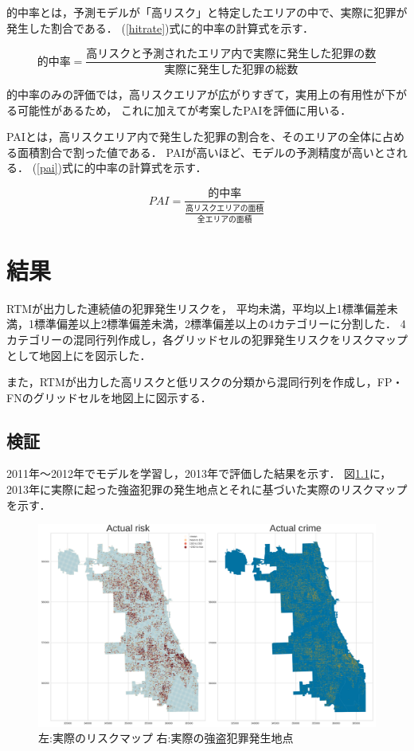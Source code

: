 \documentclass[12pt,a4paper,oneside]{jsbook}
\theoremstyle{plain}
\begin{document}
的中率とは，予測モデルが「高リスク」と特定したエリアの中で、実際に犯罪が発生した割合である．
(\ref{hitrate})式に的中率の計算式を示す．

\begin{equation}\label{hitrate}
  的中率=\frac{高リスクと予測されたエリア内で実際に発生した犯罪の数}{実際に発生した犯罪の総数}
\end{equation}

的中率のみの評価では，高リスクエリアが広がりすぎて，実用上の有用性が下がる可能性があるため，
これに加えて\citet{chainey2008utility}が考案したPAIを評価に用いる．

PAIとは，高リスクエリア内で発生した犯罪の割合を、そのエリアの全体に占める面積割合で割った値である．
PAIが高いほど、モデルの予測精度が高いとされる．
(\ref{pai})式に的中率の計算式を示す．

\begin{equation}\label{pai}
  PAI=\frac{的中率}
  {\frac{高リスクエリアの面積}{全エリアの面積}}
\end{equation}

\chapter{結果}
RTMが出力した連続値の犯罪発生リスクを，
平均未満，平均以上1標準偏差未満，1標準偏差以上2標準偏差未満，2標準偏差以上の4カテゴリーに分割した．
4カテゴリーの混同行列作成し，各グリッドセルの犯罪発生リスクをリスクマップとして地図上にを図示した．

また，RTMが出力した高リスクと低リスクの分類から混同行列を作成し，FP・FNのグリッドセルを地図上に図示する．
\section{検証}
2011年〜2012年でモデルを学習し，2013年で評価した結果を示す．
図\ref{fig:nc-val-actual}に，
2013年に実際に起った強盗犯罪の発生地点とそれに基づいた実際のリスクマップを示す．

\begin{figure}
  \centering %
  \includegraphics[scale=0.25]{./non-crime-val-figure/actual_risk_point_map.png}
  \caption{左:実際のリスクマップ 右:実際の強盗犯罪発生地点}
  \label{fig:nc-val-actual}
\end{figure}
\end{document}
